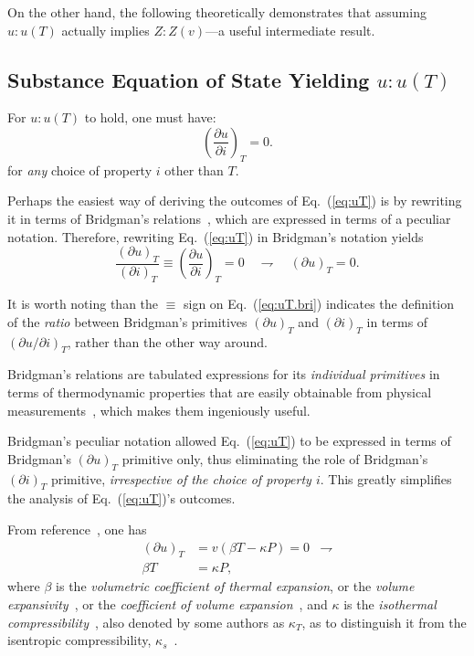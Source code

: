 \documentclass[fleqn,11pt]{SelfArx}
\newcommand{\parxyz}[3]{\left(\frac{\partial {{#1}}}{\partial {{#2}}}\right)_{\!\!\!{#3}}}
\newcommand{\inlxyz}[3]{({\partial {{#1}}}/{\partial {{#2}}})_{{#3}}}
\newcommand{\bri}[2]{(\partial {{#1}})_{{#2}}}
\begin{document}
    On the other hand, the  following  theoretically  demonstrates  that  assuming  $u\!:\!u(T)$
    actually implies $Z\!:\!Z(v)$---a useful intermediate result.

    \subsection{Substance Equation of State Yielding $u\!:\!u(T)$}

    For $u\!:\!u(T)$ to hold, one must have:
    \begin{equation}
        \parxyz uiT = 0.
        \label{eq:uT}
    \end{equation}
    \noindent for \emph{any} choice of property $i$ other than $T$.

    Perhaps the easiest way of deriving the outcomes of Eq.~(\ref{eq:uT}) is by rewriting it  in
    terms of Bridgman's relations~\cite{2006-BejanA-Wiley}, which are expressed in  terms  of  a
    peculiar notation. Therefore, rewriting Eq.~(\ref{eq:uT}) in Bridgman's notation yields
    \begin{equation}
        \frac{\bri uT}{\bri iT} \equiv \parxyz uiT = 0 \quad\rightharpoondown\quad \bri uT = 0.
        \label{eq:uT.bri}
    \end{equation}

    It is worth noting than the $\equiv$ sign on Eq.~(\ref{eq:uT.bri}) indicates the  definition
    of the \emph{ratio} between Bridgman's primitives $\bri  uT$  and  $\bri  iT$  in  terms  of
    $\inlxyz uiT$, rather than the other way around.

    Bridgman's relations are tabulated expressions for its \emph{individual primitives} in terms
    of    thermodynamic    properties    that    are    easily    obtainable    from    physical
    measurements~\cite{2006-BejanA-Wiley}, which makes them ingeniously useful.

    Bridgman's  peculiar  notation  allowed  Eq.~(\ref{eq:uT})  to  be  expressed  in  terms  of
    Bridgman's $\bri uT$ primitive only, thus eliminating  the  role  of  Bridgman's  $\bri  iT$
    primitive, \emph{irrespective of the choice of property $i$}. This  greatly  simplifies  the
    analysis of Eq.~(\ref{eq:uT})'s outcomes.

    From reference~\cite{2006-BejanA-Wiley}, one has
    \begin{align}
        \bri uT & = v(\beta T - \kappa P) = 0 & \rightharpoondown \\
        \beta T & = \kappa P,
        \label{eq:bT.kP}
    \end{align}
    \noindent where $\beta$ is the \emph{volumetric coefficient of thermal  expansion},  or  the
    \emph{volume  expansivity}~\cite{2006-BejanA-Wiley},  or  the  \emph{coefficient  of  volume
    expansion}~\cite{1986-JonesJB+HawkinsGA-Wiley},  and  $\kappa$   is   the   \emph{isothermal
    compressibility}~\cite{2006-BejanA-Wiley}, also denoted by some authors as $\kappa_T$, as to
    distinguish         it         from         the         isentropic          compressibility,
    $\kappa_s$~\cite{1986-JonesJB+HawkinsGA-Wiley}.
\end{document}
